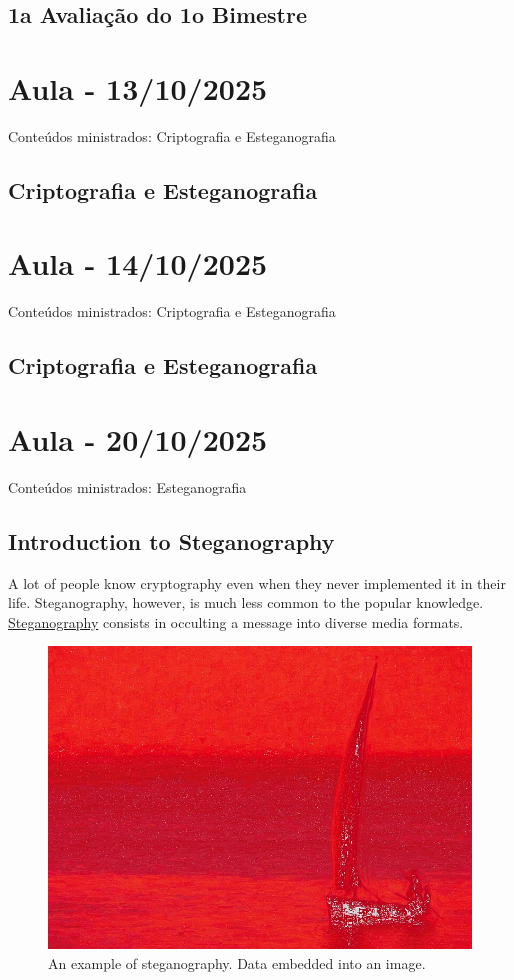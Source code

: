 \documentclass{article}
\begin{document}
\subsection{1a Avaliação do 1o Bimestre}

\section{Aula - 13/10/2025}
Conteúdos ministrados: Criptografia e Esteganografia
\subsection{Criptografia e Esteganografia}

\section{Aula - 14/10/2025}
Conteúdos ministrados: Criptografia e Esteganografia
\subsection{Criptografia e Esteganografia}

\section{Aula - 20/10/2025}
Conteúdos ministrados: Esteganografia
\subsection{Introduction to Steganography}
A lot of people know cryptography even when they never implemented it in their life. Steganography, however, is much less common to the popular knowledge. \href{https://en.wikipedia.org/wiki/Steganography}{Steganography} consists in occulting a message into diverse media formats.

\begin{figure}
\centering
\includegraphics[width=0.5\linewidth]{./images/outguess-compare.jpg}
\caption{\label{fig:steganography-example}An example of steganography. Data embedded into an image.}
\end{figure}
\end{document}
